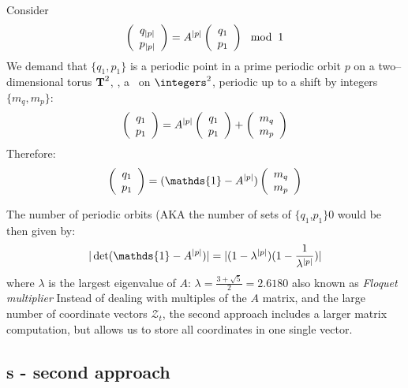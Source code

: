 Consider
\[ \left (
\begin{array}{c}
q_{{|p|}} \\
p_{{|p|}} \\
\end{array}
\right ) = A^{{|p|}} \left (
\begin{array}{c}
q_1 \\
p_1 \\
\end{array}
\right ) \mod\: 1 \]
We demand that $\{q_1,p_1\}$ is a periodic point in a prime periodic orbit
$p$ on a two--dimensional torus ${\mbox{\bf T}}^{2}$, \ie, a \rpo\ on
$\integers^2$, periodic up to a shift by integers $\{m_q,m_p\}$:
\[
\left (
\begin{array}{c}
q_1 \\
p_1 \\
\end{array}
\right ) = A^{{|p|}}
\left (
\begin{array}{c}
q_1 \\
p_1 \\
\end{array}
\right ) + \left (
\begin{array}{c}
m_q \\
m_p \\
\end{array}
\right )
\]
Therefore:
\[
\left (
\begin{array}{c}
q_1 \\
p_1 \\
\end{array}
\right ) =
(\mathds{1} - A^{\cl{p}})
\left (
\begin{array}{c}
m_q \\
m_p \\
\end{array}
\right )
\]

The number of periodic orbits (AKA the number of sets of $\{q_1$,$p_1\}$0 would be then
given by:
\[
|\det(\mathds{1} - A^{\cl{p}})| = |(1-\lambda^{\cl{p}})(1-\frac{1}{\lambda^{\cl{p}}})|
\]
where $\lambda$ is the largest eigenvalue of $A$:
$\lambda = \frac{3 + \sqrt{5}}{2} = 2.6180$ also known as \textit{Floquet multiplier}
\vskip 0.2in
Instead of dealing with multiples of the $A$ matrix, and the large number
of coordinate vectors $\mathcal{Z}_t$, the second approach includes a
larger matrix computation, but allows us to store all coordinates in one
single vector.

\subsection{\Po s - second approach}
\label{sect:AKS2ndApp}

